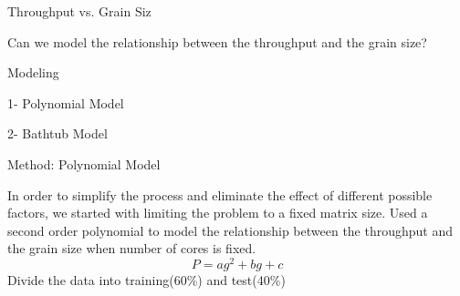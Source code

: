 \documentclass[10pt]{beamer}
\begin{document}
\begin{frame}{Throughput vs. Grain Siz}
	\begin{outline}
		Can we model the relationship between the throughput and the grain size?
	\end{outline}
\end{frame}

\begin{frame}{Modeling}
	\begin{outline}
		1- Polynomial Model
		
		
				\vspace{\baselineskip}
		2- Bathtub Model
	\end{outline}
\end{frame}

\begin{frame}{Method: Polynomial Model}
	\begin{outline}
		In order to simplify the process and eliminate the effect of different possible factors, we started with limiting the problem to a fixed matrix size.	
		\1Used a second order polynomial to model the relationship between the throughput and the grain size when number of cores is fixed.
		 $$P=ag^2+bg+c$$    
		 \1Divide the data into training(60\%) and test(40\%)
	\end{outline}
\end{frame}
\end{document}
